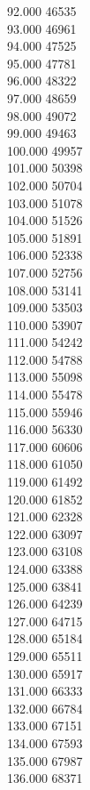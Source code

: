 { 92.000	46535 \\
 93.000	46961 \\
 94.000	47525 \\
 95.000	47781 \\
 96.000	48322 \\
 97.000	48659 \\
 98.000	49072 \\
 99.000	49463 \\
 100.000	49957 \\
 101.000	50398 \\
 102.000	50704 \\
 103.000	51078 \\
 104.000	51526 \\
 105.000	51891 \\
 106.000	52338 \\
 107.000	52756 \\
 108.000	53141 \\
 109.000	53503 \\
 110.000	53907 \\
 111.000	54242 \\
 112.000	54788 \\
 113.000	55098 \\
 114.000	55478 \\
 115.000	55946 \\
 116.000	56330 \\
 117.000	60606 \\
 118.000	61050 \\
 119.000	61492 \\
 120.000	61852 \\
 121.000	62328 \\
 122.000	63097 \\
 123.000	63108 \\
 124.000	63388 \\
 125.000	63841 \\
 126.000	64239 \\
 127.000	64715 \\
 128.000	65184 \\
 129.000	65511 \\
 130.000	65917 \\
 131.000	66333 \\
 132.000	66784 \\
 133.000	67151 \\
 134.000	67593 \\
 135.000	67987 \\
 136.000	68371 \\
}
